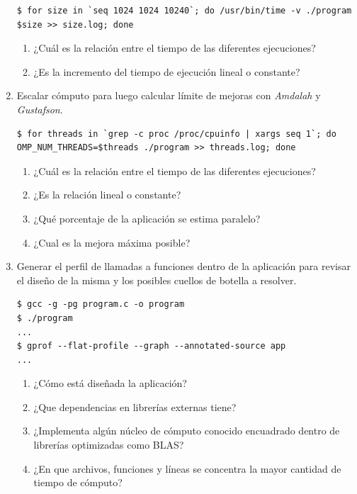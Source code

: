 \documentclass[a4paper]{report}
\begin{document}
\begin{enumerate}
\begin{lstlisting}[caption={Escalamiento de Problema},label={lst:size}]
$ for size in `seq 1024 1024 10240`; do /usr/bin/time -v ./program $size >> size.log; done
\end{lstlisting}

\begin{enumerate}
\item ¿Cuál es la relación entre el tiempo de las diferentes ejecuciones?
\item ¿Es la incremento del tiempo de ejecución lineal o constante?
\end{enumerate}

\item Escalar cómputo para luego calcular límite de mejoras con {\it Amdalah} y {\it Gustafson}.

\begin{lstlisting}[caption={Escalamiento de Cómputo},label={lst:proc}]
$ for threads in `grep -c proc /proc/cpuinfo | xargs seq 1`; do OMP_NUM_THREADS=$threads ./program >> threads.log; done
\end{lstlisting}

\begin{enumerate}
\item ¿Cuál es la relación entre el tiempo de las diferentes ejecuciones?
\item ¿Es la relación lineal o constante?
\item ¿Qué porcentaje de la aplicación se estima paralelo?
\item ¿Cual es la mejora máxima posible?
\end{enumerate}

\item Generar el perfil de llamadas a funciones dentro de la aplicación para revisar el diseño de la misma y los posibles cuellos de botella a resolver.

\begin{lstlisting}[caption={Generación de Perfil de Rendimiento},label={lst:gprofall}]
$ gcc -g -pg program.c -o program
$ ./program
...
$ gprof --flat-profile --graph --annotated-source app
...
\end{lstlisting}

\begin{enumerate}
\item ¿Cómo está diseñada la aplicación?
\item ¿Que dependencias en librerías externas tiene?
\item ¿Implementa algún núcleo de cómputo conocido encuadrado dentro de librerías optimizadas como BLAS?
\item ¿En que archivos, funciones y líneas se concentra la mayor cantidad de tiempo de cómputo?
\end{enumerate}


\end{enumerate}
\end{document}
